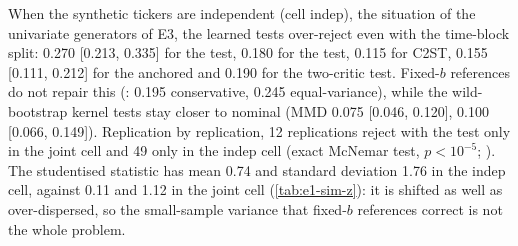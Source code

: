 When the synthetic tickers are independent (cell indep), the situation of the univariate generators
of E3, the learned tests over-reject even with the time-block split: 0.270 [0.213, 0.335] for the
\WC{} test, 0.180 for the \LRC{} test, 0.115 for C2ST, 0.155 [0.111, 0.212] for the anchored and 0.190
for the two-critic test. Fixed-$b$ references do not repair this (\WC{}: 0.195 conservative, 0.245
equal-variance), while the wild-bootstrap kernel tests stay closer to nominal (MMD 0.075
[0.046, 0.120], \SigMMD{} 0.100 [0.066, 0.149]). Replication by replication, 12 replications reject
with the \WC{} test only in the joint cell and 49 only in the indep cell (exact McNemar test,
$p<10^{-5}$; \citealp{mcnemar_1947_note}). The studentised \WC{} statistic has mean 0.74 and
standard deviation 1.76 in the indep cell, against 0.11 and 1.12 in the joint cell
(\cref{tab:e1-sim-z}): it is shifted as well as over-dispersed, so the small-sample variance that
fixed-$b$ references correct is not the whole problem.

\begin{table}[tbp]
  \centering
  \caption{Statistic and Driscoll--Kraay standard error under the E1(a) placebo null (time-block
    split, $\zhac=T/\mathrm{s.e.}$), 200 replications per cell: mean and standard deviation of
    the raw statistic $T$ over replications, median standard error, ratio of the standard
    deviation of $T$ to the root mean square (rms) of the standard error, Spearman correlation of
    $T$ and its standard error across replications, and the rejection rate at nominal 5\%
    ($\zhac>1.645$) in the half of the replications with a standard error at or below the cell
    median and in the other half. C2ST, whose statistic is an accuracy, is omitted.}
  \label{tab:e1-sim-se}
  \small
\end{table}

